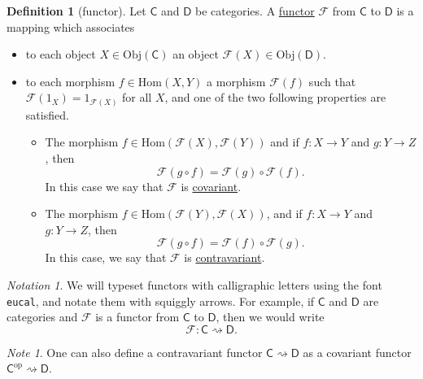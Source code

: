 \documentclass[a4paper,10pt]{scrreprt}
\newcommand{\defn}[1]{\ul{#1}}
\newcommand{\Obj}{\mathrm{Obj}}
\newcommand{\Hom}{\mathrm{Hom}}
\theoremstyle{definition}
\newtheorem{definition}{Definition}[section]
\theoremstyle{plain}
\theoremstyle{remark}
\newtheorem{note}{Note}[section]
\newtheorem{notation}{Notation}[section]
\begin{document}
\begin{definition}[functor] 
  \label{def:functor} 
  Let $\mathsf{C}$ and $\mathsf{D}$ be categories. A \defn{functor} $\mathcal{F}$ from $\mathsf{C}$ to $\mathsf{D}$ is a mapping which associates 
  \begin{itemize} 
    \item to each object $X \in \Obj(\mathsf{C})$ an object $\mathcal{F}(X) \in \Obj(\mathsf{D})$.

    \item to each morphism $f \in \Hom(X, Y)$ a morphism $\mathcal{F}(f)$ such that $\mathcal{F}(1_{X}) = 1_{\mathcal{F}(X)}$ for all $X$, and one of the two following properties are satisfied.
      \begin{itemize} 
        \item The morphism $f \in \Hom(\mathcal{F}(X), \mathcal{F}(Y))$ and if $f:X \to Y$ and $g\colon Y \to Z$, then 
          \begin{equation*}
            \mathcal{F}(g \circ f) = \mathcal{F}(g) \circ \mathcal{F}(f).
          \end{equation*}
          In this case we say that $\mathcal{F}$ is \defn{covariant}.

        \item The morphism $f \in \Hom(\mathcal{F}(Y), \mathcal{F}(X))$, and if $f\colon X \to Y$ and $g\colon Y \to Z$, then
          \begin{equation*}
            \mathcal{F}(g \circ f) = \mathcal{F}(f) \circ \mathcal{F}(g).
          \end{equation*}
          In this case, we say that $\mathcal{F}$ is \defn{contravariant}.
      \end{itemize} 
  \end{itemize} 
\end{definition}

\begin{notation}
  We will typeset functors with calligraphic letters using the font \texttt{eucal}, and notate them with squiggly arrows. For example, if $\mathsf{C}$ and $\mathsf{D}$ are categories and $\mathcal{F}$ is a functor from $\mathsf{C}$ to $\mathsf{D}$, then we would write
  \begin{equation*}
    \mathcal{F}\colon \mathsf{C} \rightsquigarrow \mathsf{D}.
  \end{equation*}
\end{notation}

\begin{note}
  \label{note:contravariantfunctorisfunctorfromoppositecategory}
  One can also define a contravariant functor $\mathsf{C} \rightsquigarrow \mathsf{D}$ as a covariant functor $\mathsf{C}^{\mathrm{op}} \rightsquigarrow \mathsf{D}$.
\end{note}
\end{document}

